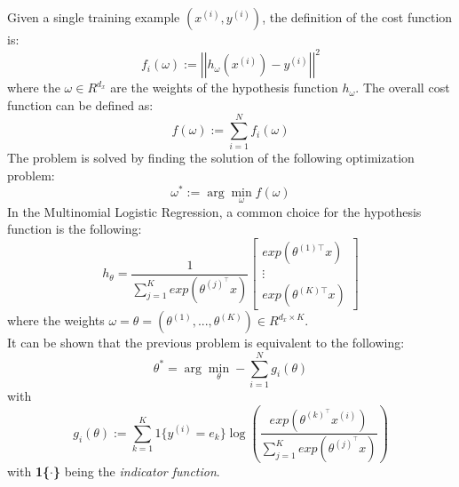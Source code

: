 \documentclass[a4paper,11pt,oneside]{book}
\begin{document}
Given a single training example $(x^{(i)}, y^{(i)})$, the definition of the cost function is:
\begin{equation}
f_i\left(\omega\right):=\left|\left|h_\omega\left(x^{(i)}\right)-y^{(i)}\right|\right|^2
\end{equation}
where the $\omega \in R^{d_{x}}$ are the weights of the hypothesis function $h_{\omega}$. The overall cost function can be defined as:
\begin{equation}
f\left(\omega\right):=\sum_{i=1}^{N}{f_i\left(\omega\right)}
\end{equation}
The problem is solved by finding the solution of the following optimization problem:
\begin{equation}
\omega^*:=\arg\min_\omega f\left(\omega\right)
\end{equation}
In the Multinomial Logistic Regression, a common choice for the hypothesis function is the following:
\begin{equation}
h_\theta=\frac{1}{\sum_{j=1}^{K}{exp\left(\theta^{(j)^\top}x\right)}}\begin{bmatrix}exp\left(\theta^{(1)\top}x\right)  \\ \vdots \\ exp\left(\theta^{(K)\top}x\right) \end{bmatrix}
\end{equation}
where the weights $\omega = \theta = (\theta^{(1)}, ..., \theta^{(K)}) \in R^{{d_{x}} \times K }$. \\
It can be shown that the previous problem is equivalent to the following:
\begin{equation}\label{EQ1.7}
\theta^*=\arg\min_\theta -\sum_{i=1}^{N}{g_i(\theta)}
\end{equation}
with
\begin{equation} \label{EQ1.8}
g_i\left(\theta\right):=\sum_{k=1}^{K}{1\{y^{(i)}=e_k\}\log{\left( \frac{exp(\theta^{(k)^\top}x^{(i)})}{\sum_{j=1}^{K}{exp( \theta^{(j)^\top}x )}} \right)}}
\end{equation}
with \textbf{1\{$\cdot$\}} being the \textit{indicator function}.\cite{CITATION:2}
\end{document}
